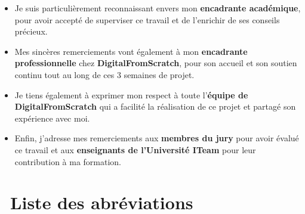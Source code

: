 \documentclass[12pt,a4paper]{report}
\begin{document}
\begin{itemize}
    \item Je suis particulièrement reconnaissant envers mon \textbf{\color{primaryblue}encadrante académique}, pour avoir accepté de superviser ce travail et de l'enrichir de ses conseils précieux.

    \item Mes sincères remerciements vont également à mon \textbf{\color{primaryblue}encadrante professionnelle} chez \textbf{\color{accentgreen}DigitalFromScratch}, pour son accueil et son soutien continu tout au long de ces 3 semaines de projet.

    \item Je tiens également à exprimer mon respect à toute l'\textbf{\color{primaryblue}équipe de DigitalFromScratch} qui a facilité la réalisation de ce projet et partagé son expérience avec moi.

    \item Enfin, j'adresse mes remerciements aux \textbf{\color{primaryblue}membres du jury} pour avoir évalué ce travail et aux \textbf{\color{primaryblue}enseignants de l'Université ITeam} pour leur contribution à ma formation.
\end{itemize}

\newpage
\renewcommand{\contentsname}{\color{primaryblue}\faList\ Table des matières}
\tableofcontents

\newpage
\renewcommand{\listfigurename}{\color{primaryblue}\faImage\ Liste des figures}
\listoffigures

\newpage
\renewcommand{\listtablename}{\color{primaryblue}\faTable\ Liste des tableaux}
\listoftables

\newpage
\chapter*{\color{primaryblue}\faBook\ Liste des abréviations}
\end{document}
